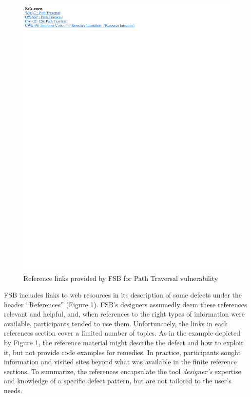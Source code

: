 \documentclass[10pt,journal,compsoc]{IEEEtran}
\begin{document}
\begin{figure}
	\centering
	\includegraphics[width=\columnwidth]{Images/FSBRefs}
	\caption{Reference links provided by FSB for Path Traversal vulnerability}
	\label{fig:links} 
\end{figure}


FSB includes links to web resources in its description of some defects under the header ``References'' (Figure \ref{fig:links}).
FSB's designers assumedly deem these references relevant and helpful, and, when references to the right types of information were available, participants tended to use them.
Unfortunately, the links in each references section cover a limited number of topics.
As in the example depicted by Figure \ref{fig:links}, the reference material might describe the defect and how to exploit it, but not provide code examples for remedies.
In practice, participants sought information and visited sites beyond what was available in the finite reference sections.
To summarize, the references encapsulate the tool \textit{designer's} expertise and knowledge of a specific defect pattern, but are not tailored to the user's needs.
\end{document}
